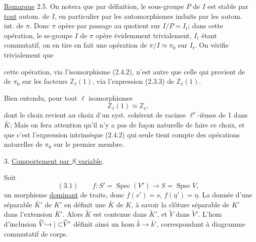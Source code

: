 \uline{Remarque} 2.5. On notera que par définition, le sous-groupe $P$ de $I$ est stable par \uline{tout} autom. de $I$, en particulier par les automorphismes induits par les autom. int. de $\pi$. Donc $\pi$ opère par passage au quotient sur $I/P=I_t$;  dans cette opération, le  ss-groupe $I$ de $\pi$ opère évidemment trivialement, $I_t$ étant commutatif, on en tire en fait une opération de $\pi/I\simeq\pi_0$ sur $I_t$.  On vérifie trivialement que

cette opération, via l'isomorphisme (2.4.2),  n'est autre que celle qui provient de   de $\pi_0$ sur les facteurs $\mathbb Z_\ell(1)$, via l'expression (2.3.3) de $\mathbb Z_\ell(1)$.

Bien entendu, pour tout $\ell$   isomorphismes
\[
\mathbb Z_\ell(1)\simeq\mathbb Z_\ell,
\]
dont le choix revient au choix d'un syst. cohérent de racines  $\ell^\nu$-ièmes de 1 dans $\bar K$; Mais on fera attention qu'il n'y a pas de façon naturelle de faire ce choix, et que c'est l'expression intrinsèque (2.4.2) qui seule  tient compte des opérations naturelles de $\pi_0$ sur le premier membre.

3. \uline{Comportement par  $S$ variable}.

Soit
\[
(3.1)\qquad f:S'=\operatorname{Spec}(V')\longrightarrow S=\operatorname{Spec}V,
\]
un morphisme \uline{dominant} de traits,  donc $f(s')=s$, $f(\eta')=\eta$. La donnée d'une   séparable  $\bar K'$ de $K'$ en définit une $\bar K$ de $K$, à savoir la clôture séparable de $K'$ dans l'extension $\bar K'$. Alors $\widetilde K$ est contenue dans $\widetilde K'$, et $\widetilde V$ dans $\widetilde V'$. L'hom d'inclusion $\widetilde V{\hookrightarrow|\subset}\widetilde V'$ définit ainsi un hom $\bar k\longrightarrow\bar k'$, correspondant à   diagramme commutatif de corps.


